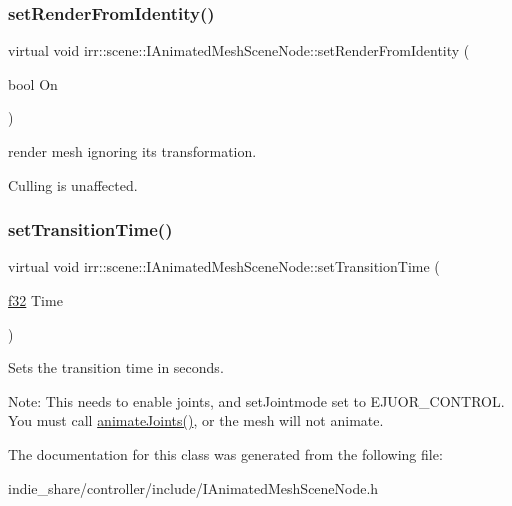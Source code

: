\subsubsection{\texorpdfstring{set\+Render\+From\+Identity()}{setRenderFromIdentity()}}
{\footnotesize\ttfamily virtual void irr\+::scene\+::\+I\+Animated\+Mesh\+Scene\+Node\+::set\+Render\+From\+Identity (\begin{DoxyParamCaption}\item[{bool}]{On }\end{DoxyParamCaption})\hspace{0.3cm}{\ttfamily [pure virtual]}}



render mesh ignoring its transformation. 

Culling is unaffected. \mbox{\label{classirr_1_1scene_1_1IAnimatedMeshSceneNode_a424d2dc577842949094a9d8c2a3eba0e}} 
\subsubsection{\texorpdfstring{set\+Transition\+Time()}{setTransitionTime()}}
{\footnotesize\ttfamily virtual void irr\+::scene\+::\+I\+Animated\+Mesh\+Scene\+Node\+::set\+Transition\+Time (\begin{DoxyParamCaption}\item[{\hyperlink{namespaceirr_a0277be98d67dc26ff93b1a6a1d086b07}{f32}}]{Time }\end{DoxyParamCaption})\hspace{0.3cm}{\ttfamily [pure virtual]}}



Sets the transition time in seconds. 

Note\+: This needs to enable joints, and set\+Jointmode set to E\+J\+U\+O\+R\+\_\+\+C\+O\+N\+T\+R\+OL. You must call \hyperlink{classirr_1_1scene_1_1IAnimatedMeshSceneNode_a76af2c9a2b0cea6ee2b3559c1f32f850}{animate\+Joints()}, or the mesh will not animate. 

The documentation for this class was generated from the following file\+:\begin{DoxyCompactItemize}
\item 
indie\+\_\+share/controller/include/I\+Animated\+Mesh\+Scene\+Node.\+h\end{DoxyCompactItemize}
